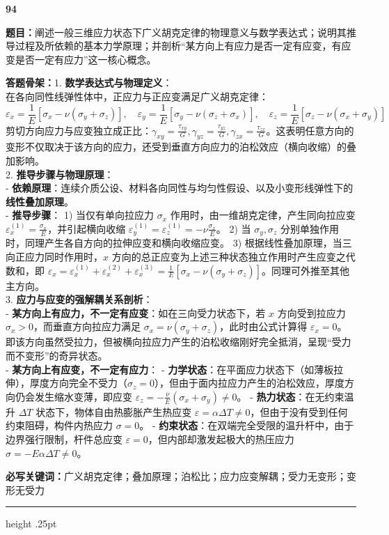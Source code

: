 \documentclass[a4paper,10pt]{article}
\newcommand{\qitem}[5]{%
\Needspace{6\baselineskip}
\vspace{3pt}
{\Large\bfseries\color{deep} #1}\quad{\bfseries\color{orangea}#2}\par
\textbf{题目：}#3\par
\textbf{答题骨架：}#4\par
\textbf{必写关键词：}{\color{bluea}#5}\par
\vspace{2pt}\hrule height .25pt
}
\begin{document}
\qitem{94}{广义胡克定律与应力应变解耦}
{阐述一般三维应力状态下广义胡克定律的物理意义与数学表达式；说明其推导过程及所依赖的基本力学原理；并剖析“某方向上有应力是否一定有应变，有应变是否一定有应力”这一核心概念。}
{1. \textbf{数学表达式与物理定义}：\\
   在各向同性线弹性体中，正应力与正应变满足广义胡克定律：
   \[ \varepsilon_x = \frac{1}{E} \left[ \sigma_x - \nu(\sigma_y + \sigma_z) \right], \quad \varepsilon_y = \frac{1}{E} \left[ \sigma_y - \nu(\sigma_z + \sigma_x) \right], \quad \varepsilon_z = \frac{1}{E} \left[ \sigma_z - \nu(\sigma_x + \sigma_y) \right] \]
   剪切方向应力与应变独立成正比：\(\gamma_{xy} = \frac{\tau_{xy}}{G}, \gamma_{yz} = \frac{\tau_{yz}}{G}, \gamma_{zx} = \frac{\tau_{zx}}{G}\)。这表明任意方向的变形不仅取决于该方向的应力，还受到垂直方向应力的泊松效应（横向收缩）的叠加影响。\\
2. \textbf{推导步骤与物理原理}：\\
   - \textbf{依赖原理}：连续介质公设、材料各向同性与均匀性假设、以及小变形线弹性下的\textbf{线性叠加原理}。\\
   - \textbf{推导步骤}：
     1) 当仅有单向拉应力 \(\sigma_x\) 作用时，由一维胡克定律，产生同向拉应变 \(\varepsilon_x^{(1)} = \frac{\sigma_x}{E}\)，并引起横向收缩 \(\varepsilon_y^{(1)} = \varepsilon_z^{(1)} = -\nu \frac{\sigma_x}{E}\)。
     2) 当 \(\sigma_y, \sigma_z\) 分别单独作用时，同理产生各自方向的拉伸应变和横向收缩应变。
     3) 根据线性叠加原理，当三向正应力同时作用时，\(x\) 方向的总正应变为上述三种状态独立作用时产生应变之代数和，即 \(\varepsilon_x = \varepsilon_x^{(1)} + \varepsilon_x^{(2)} + \varepsilon_x^{(3)} = \frac{1}{E}[\sigma_x - \nu(\sigma_y + \sigma_z)]\)。同理可外推至其他主方向。\\
3. \textbf{应力与应变的强解耦关系剖析}：\\
   - \textbf{某方向上有应力，不一定有应变}：如在三向受力状态下，若 \(x\) 方向受到拉应力 \(\sigma_x > 0\)，而垂直方向拉应力满足 \(\sigma_x = \nu(\sigma_y + \sigma_z)\)，此时由公式计算得 \(\varepsilon_x = 0\)。即该方向虽然受拉力，但被横向拉应力产生的泊松收缩刚好完全抵消，呈现“受力而不变形”的奇异状态。\\
   - \textbf{某方向上有应变，不一定有应力}：
     - \textbf{力学状态}：在平面应力状态下（如薄板拉伸），厚度方向完全不受力（\(\sigma_z = 0\)），但由于面内拉应力产生的泊松效应，厚度方向仍会发生缩水变薄，即应变 \(\varepsilon_z = -\frac{\nu}{E}(\sigma_x + \sigma_y) \neq 0\)。
     - \textbf{热力状态}：在无约束温升 \(\Delta T\) 状态下，物体自由热膨胀产生热应变 \(\varepsilon = \alpha\Delta T \neq 0\)，但由于没有受到任何约束阻碍，构件内热应力 \(\sigma = 0\)。
     - \textbf{约束状态}：在双端完全受限的温升杆中，由于边界强行限制，杆件总应变 \(\varepsilon = 0\)，但内部却激发起极大的热压应力 \(\sigma = -E\alpha\Delta T \neq 0\)。}
{广义胡克定律；叠加原理；泊松比；应力应变解耦；受力无变形；变形无受力}
\end{document}
